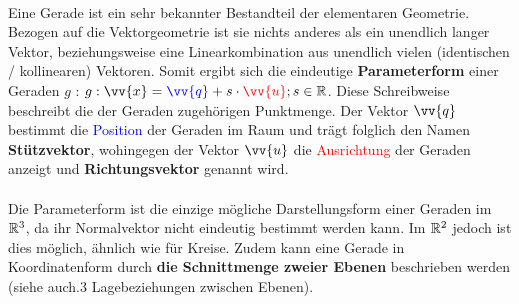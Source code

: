         \paragraph{} Eine Gerade ist ein sehr bekannter Bestandteil der elementaren Geometrie. Bezogen auf die Vektorgeometrie ist sie nichts anderes als ein
        unendlich langer Vektor, beziehungsweise eine Linearkombination aus unendlich vielen (identischen / kollinearen) Vektoren. Somit ergibt sich die
        eindeutige \textbf{Parameterform} einer Geraden $g$ : \quad$g:\vv{x}=\textcolor{blue}{\vv{q}}+s\cdot\textcolor{red}{\vv{u}};s\in\R$. Diese Schreibweise
        beschreibt die der Geraden zugehörigen Punktmenge. Der Vektor $\vv{q}$ bestimmt die \textcolor{blue}{Position} der Geraden im Raum und trägt folglich
        den Namen \textbf{Stützvektor}, wohingegen der Vektor $\vv{u}$ die \textcolor{red}{Ausrichtung} der Geraden anzeigt und \textbf{Richtungsvektor} genannt
        wird.
        \\
        \begin{Bemerkung}
            \paragraph{} Die Parameterform ist die einzige mögliche Darstellungsform einer Geraden im $\mathbb{R}^3$, da ihr Normalvektor nicht eindeutig bestimmt
            werden kann. Im $\mathbb{R}^2$ jedoch ist dies möglich, ähnlich wie für Kreise. Zudem kann eine Gerade in Koordinatenform durch \textbf{die
            Schnittmenge zweier Ebenen} beschrieben werden (siehe auch.3 Lagebeziehungen zwischen Ebenen\grqq).
        \end{Bemerkung}

        \begin{center}
        \end{center}

